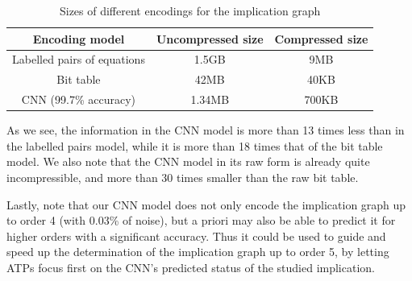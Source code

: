 \begin{table}[h]
\centering
\caption{Sizes of different encodings for the implication graph}
\begin{tabular}{|c|c|c|}
  \hline
  \textbf{Encoding model} & \textbf{Uncompressed size} & \textbf{Compressed size} \\\hline\hline
  Labelled pairs of equations & 1.5GB & 9MB \\\hline
  Bit table & 42MB & 40KB \\\hline
  CNN (99.7\% accuracy) & 1.34MB & 700KB \\
  \hline
\end{tabular}
\end{table}

\smallskip

\noindent As we see, the information in the CNN model is more than 13 times less than in the labelled pairs model, while it is more than 18 times that of the bit table model. We also note that the CNN model in its raw form is already quite incompressible, and more than 30 times smaller than the raw bit table.

\smallskip

Lastly, note that our CNN model does not only encode the implication graph up to order 4 (with 0.03\% of noise), but a priori may also be able to predict it for higher orders with a significant accuracy. Thus it could be used to guide and speed up the determination of the implication graph up to order 5, by letting ATPs focus first on the CNN’s predicted status of the studied implication.
